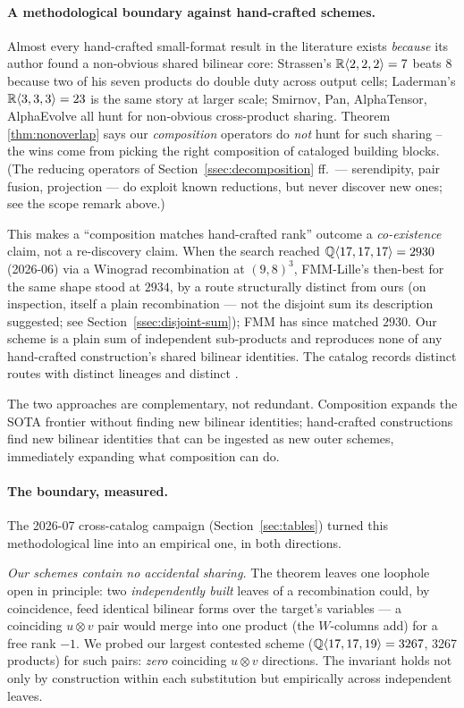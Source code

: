 \paragraph{A methodological boundary against hand-crafted schemes.}
Almost every hand-crafted small-format result in the literature
exists \emph{because} its author found a non-obvious shared
bilinear core: Strassen's \(\mathbb{R}\langle 2, 2, 2 \rangle = 7\)
beats 8 because two of his seven products do double duty across
output cells; Laderman's \(\mathbb{R}\langle 3, 3, 3 \rangle = 23\)
is the same story at larger scale; Smirnov, Pan, AlphaTensor,
AlphaEvolve all hunt for non-obvious cross-product sharing.
Theorem \ref{thm:nonoverlap} says our \emph{composition} operators do
\emph{not} hunt for such sharing -- the wins come from picking the
right composition of cataloged building blocks. (The reducing operators
of Section~\ref{ssec:decomposition} ff.\ --- serendipity, pair fusion,
projection --- do exploit known reductions, but never discover new ones;
see the scope remark above.)

This makes a ``composition matches hand-crafted rank'' outcome a
\emph{co-existence} claim, not a re-discovery claim. When the search
reached \(\mathbb{Q}\langle 17, 17, 17 \rangle = 2930\) (2026-06) via a
Winograd recombination at \((9,8)^3\), FMM-Lille's then-best for the
same shape stood at \(2934\), by a route structurally distinct from
ours (on inspection, itself a plain recombination --- not the disjoint
sum its description suggested; see Section~\ref{ssec:disjoint-sum});
FMM has since matched \(2930\). Our scheme is a plain sum of
independent sub-products and reproduces none of any hand-crafted
construction's shared bilinear identities. The catalog records
distinct routes with distinct lineages and distinct
.

The two approaches are complementary, not redundant. Composition
expands the SOTA frontier without finding new bilinear identities;
hand-crafted constructions find new bilinear identities that can be
ingested as new outer schemes, immediately expanding what
composition can do.

\paragraph{The boundary, measured.} The 2026-07 cross-catalog
campaign (Section~\ref{sec:tables}) turned this methodological line
into an empirical one, in both directions.

\emph{Our schemes contain no accidental sharing.} The theorem leaves
one loophole open in principle: two \emph{independently built} leaves
of a recombination could, by coincidence, feed identical bilinear
forms over the target's variables --- a coinciding \(u \otimes v\) pair
would merge into one product (the \(W\)-columns add) for a free rank
\(-1\). We probed our largest contested scheme
(\(\mathbb{Q}\langle 17, 17, 19 \rangle = 3267\), 3267 products) for such
pairs: \emph{zero} coinciding \(u \otimes v\) directions. The
invariant holds not only by construction within each substitution but
empirically across independent leaves.

